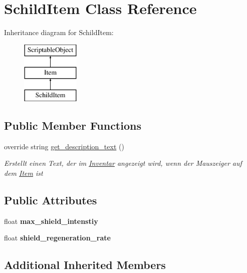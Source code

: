 \hypertarget{class_schild_item}{}\section{Schild\+Item Class Reference}
\label{class_schild_item}
Inheritance diagram for Schild\+Item\+:\begin{figure}[H]
\begin{center}
\leavevmode
\includegraphics[height=3.000000cm]{class_schild_item}
\end{center}
\end{figure}
\subsection*{Public Member Functions}
\begin{DoxyCompactItemize}
\item 
override string \hyperlink{class_schild_item_a6e09e58ec5afc082636c1a9b4b715613}{get\+\_\+description\+\_\+text} ()
\begin{DoxyCompactList}\small\item\em Erstellt einen Text, der im \hyperlink{class_inventar}{Inventar} angezeigt wird, wenn der Mauszeiger auf dem \hyperlink{class_item}{Item} ist \end{DoxyCompactList}\end{DoxyCompactItemize}
\subsection*{Public Attributes}
\begin{DoxyCompactItemize}
\item 
\mbox{\label{class_schild_item_a4760ae8809ff93a66903837b3826f1f0}} 
float {\bfseries max\+\_\+shield\+\_\+intenstiy}
\item 
\mbox{\label{class_schild_item_a7d75abbdf47c1aaefe1f5590317b2976}} 
float {\bfseries shield\+\_\+regeneration\+\_\+rate}
\end{DoxyCompactItemize}
\subsection*{Additional Inherited Members}


